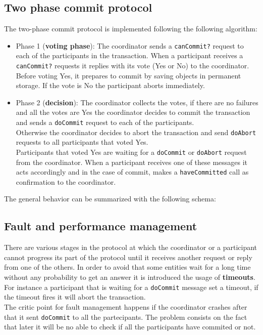 \subsection{Two phase commit protocol}
The two-phase commit protocol is implemented following the following algorithm:
\begin{itemize}
	\item Phase 1 (\textbf{voting phase}): The coordinator sends a \verb|canCommit?| request to each of the participants in the transaction. When a participant receives a \verb|canCommit?| requests it replies with its vote (Yes or No) to the coordinator. Before voting Yes, it prepares to commit by saving objects in permanent storage. If the vote is No the participant aborts immediately.
	\item Phase 2 (\textbf{decision}): The coordinator collects the votes, if there are no failures and all the votes are Yes the coordinator decides to commit the transaction and sends a \verb|doCommit| request to each of the participants.\\ Otherwise the coordinator decides to abort the transaction and send \verb|doAbort| requests to all participants that voted Yes.\\
	Participants that voted Yes are waiting for a \verb|doCommit| or \verb|doAbort| request from the coordinator. When a participant receives one of these messages it acts accordingly and in the case of commit, makes a \verb|haveCommitted| call as confirmation to the coordinator.
\end{itemize}


The general behavior can be summarized with the following schema:


\subsection{Fault and performance management}
There are various stages in the protocol at which the coordinator or a participant cannot progress its part of the protocol until it receives another request or reply from one of the others. In order to avoid that some entities wait for a long time without any probability to get an answer it is introduced the usage of \textbf{timeouts}. For instance a participant that is waiting for a \verb|doCommit| message set a timeout, if the timeout fires it will abort the transaction.\\
The critic point for fault management happens if the coordinator crashes after that it sent \verb|doCommit| to all the partecipants. The problem consists on the fact that later it will be no able to check if all the participants have commited or not.\\


